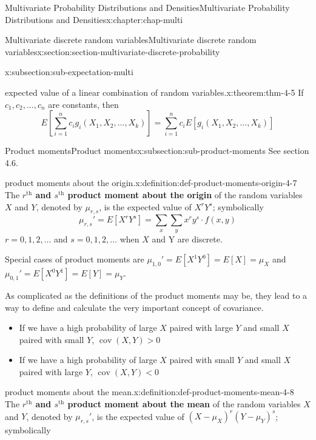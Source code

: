 \documentclass[oneside,10pt,]{book}
\newcommand{\terminology}[1]{\textbf{#1}}
\numberwithin{equation}{section}
\newcommand{\lt}{<}
\newcommand{\gt}{>}
\begin{document}
\begin{chapterptx}{Multivariate Probability Distributions and Densities}{}{Multivariate Probability Distributions and Densities}{}{}{x:chapter:chap-multi}
\begin{sectionptx}{Multivariate discrete random variables}{}{Multivariate discrete random variables}{}{}{x:section:section-multivariate-discrete-probability}
\begin{subsectionptx}{}{}{}{}{}{x:subsection:sub-expectation-multi}
\begin{theorem}{expected value of a linear combination of random variables.}{}{x:theorem:thm-4-5}
If \(\displaystyle c_1, c_2, \dots, c_n\) are constants, then%
\begin{equation*}
E\left[\sum_{i=1}^n c_i g_i(X_1, X_2, \dots, X_k)\right] =
\sum_{i=1}^n c_i E\left[g_i(X_1, X_2, \dots, X_k)\right]
\end{equation*}
%
\end{theorem}
\end{subsectionptx}
%
%
\typeout{************************************************}
\typeout{************************************************}
%
\begin{subsectionptx}{Product moments}{}{Product moments}{}{}{x:subsection:sub-product-moments}
See section 4.6.%
\begin{definition}{product moments about the origin.}{x:definition:def-product-moments-origin-4-7}%
The \terminology{\(\displaystyle r^\text{th}\) and \(\displaystyle
s^\text{th}\) product moment about the origin} of the random variables \(X\) and \(Y\), denoted by \(\displaystyle \mu_{r,s}\), is the expected value of \(\displaystyle X^rY^s\); symbolically%
\begin{equation*}
\mu_{r,s}'=E[X^rY^s] = \sum_x\sum_y x^r y^s\cdot f(x, y)
\end{equation*}
\(\displaystyle r = 0,1,2, \dots\) and \(\displaystyle s = 0,1,2,
\dots\) when \(X\) and Y are discrete.%
\end{definition}
Special cases of product moments are \(\displaystyle \mu_{1,0}' =
E[X^1Y^0] = E[X] = \mu_X\) and \(\displaystyle \mu_{0,1}' = E[X^0Y^1]
= E[Y] = \mu_Y\).%
\par
As complicated as the definitions of the product moments may be, they lead to a way to define and calculate the very important concept of covariance.%
\begin{itemize}[label=\textbullet]
\item{}If we have a high probability of large \(X\) paired with large \(Y\) and small \(\displaystyle
X\) paired with small \(Y\), \(\displaystyle
\operatorname{cov}(X,Y) \gt 0\)%
\item{}If we have a high probability of large \(X\) paired with small \(Y\) and small \(\displaystyle
X\) paired with large \(Y\), \(\displaystyle
\operatorname{cov}(X,Y) \lt 0\)%
\end{itemize}
%
\begin{definition}{product moments about the mean.}{x:definition:def-product-moments-mean-4-8}%
The \terminology{\(\displaystyle r^\text{th}\) and \(\displaystyle
s^\text{th}\) product moment about the mean} of the random variables \(X\) and \(Y\), denoted by \(\displaystyle \mu_{r,s}'\), is the expected value of \(\displaystyle (X-\mu_X)^r(Y-\mu_Y)^s\); symbolically%

\end{definition}
\end{subsectionptx}
\end{sectionptx}
\end{chapterptx}
\end{document}
